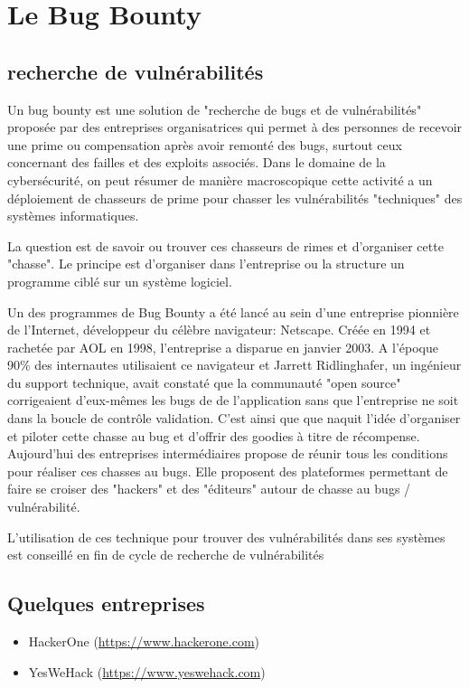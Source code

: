 \section{Le Bug Bounty}

\subsection{recherche de vulnérabilités}

Un bug bounty est une solution de "recherche de bugs et de vulnérabilités" proposée par des entreprises organisatrices qui permet à des personnes de recevoir une prime ou compensation après avoir remonté des bugs, surtout ceux concernant des failles et des exploits associés. Dans le domaine de la cybersécurité, on peut résumer de manière macroscopique cette activité  a un déploiement de chasseurs de prime pour chasser les vulnérabilités "techniques" des systèmes informatiques.

La question est de savoir ou trouver ces chasseurs de rimes et d'organiser cette "chasse". Le principe est d'organiser dans l'entreprise ou la structure un programme ciblé sur un système logiciel.

Un des programmes de Bug Bounty  a été lancé au sein d’une entreprise pionnière de l'Internet, développeur du célèbre navigateur: Netscape. Créée en 1994 et rachetée par AOL en 1998, l’entreprise a disparue en janvier 2003.
A l'époque 90\% des internautes utilisaient ce navigateur et Jarrett Ridlinghafer, un ingénieur du support technique, avait constaté que la communauté "open source" corrigeaient d’eux-mêmes les bugs de de l'application sans que l'entreprise ne soit dans la boucle de contrôle validation. C'est ainsi que que naquit l'idée d'organiser et piloter cette chasse au bug et d'offrir des goodies à titre de récompense. 
Aujourd'hui des entreprises intermédiaires propose de réunir tous les conditions pour réaliser ces chasses au bugs.
Elle proposent des plateformes permettant de faire se croiser des "hackers" et des "éditeurs" autour de chasse au bugs / vulnérabilité.

L'utilisation de ces technique pour trouver des vulnérabilités dans ses systèmes est conseillé en fin de cycle de recherche de vulnérabilités

\subsection{Quelques entreprises}

\begin{itemize}
    \item HackerOne (\url{https://www.hackerone.com})
    \item YesWeHack (\url{https://www.yeswehack.com})
\end{itemize}


